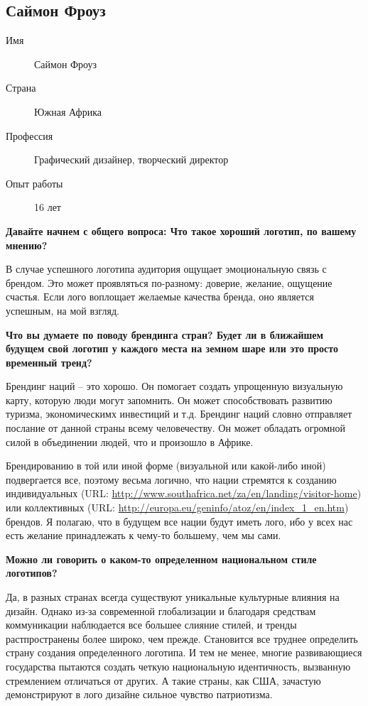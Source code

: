 \clearpage
\subsection{Саймон Фроуз}

\begin{description}
\item[Имя] Саймон Фроуз
\item[Страна] Южная Африка
\item[Профессия] Графический дизайнер, творческий директор
\item[Опыт работы] 16 лет
\end{description}

\textbf{Давайте начнем с общего вопроса: Что такое хороший логотип, по вашему мнению?}

В случае успешного логотипа аудитория ощущает эмоциональную связь с брендом. Это может проявляться по-разному: доверие, желание, ощущение счастья. Если лого воплощает желаемые качества бренда, оно является успешным, на мой взгляд.


\textbf{Что вы думаете по поводу брендинга стран? Будет ли в ближайшем будущем свой логотип у каждого места на земном шаре или это просто временный тренд?}

Брендинг наций – это хорошо. Он помогает создать упрощенную визуальную карту, которую люди могут запомнить. Он может способствовать развитию туризма, экономическимх инвестиций и т.д. Брендинг наций словно отправляет послание от данной страны всему человечеству. Он может обладать огромной силой в объединении людей, что и произошло в Африке.

Брендированию в той или иной форме (визуальной или какой-либо иной) подвергается все, поэтому весьма
логично, что нации стремятся к созданию индивидуальных
(URL: \url{http://www.southafrica.net/za/en/landing/visitor-home}) или коллективных
(URL: \url{http://europa.eu/geninfo/atoz/en/index_1_en.htm}) брендов. Я полагаю, что в будущем все нации
будут иметь лого, ибо у всех нас есть желание принадлежать к чему-то большему, чем мы сами.

\textbf{Можно ли говорить о каком-то определенном национальном стиле логотипов?}

Да, в разных странах всегда существуют уникальные культурные влияния на дизайн. Однако из-за современной глобализации и благодаря средствам коммуникации наблюдается все большее слияние стилей, и тренды растпространены более широко, чем прежде. Становится все труднее определить страну создания определенного логотипа. И тем не менее, многие развивающиеся государства пытаются создать четкую национальную идентичность, вызванную стремлением отличаться от других. А такие страны, как США, зачастую демонстрируют в лого дизайне  сильное чувство патриотизма.


